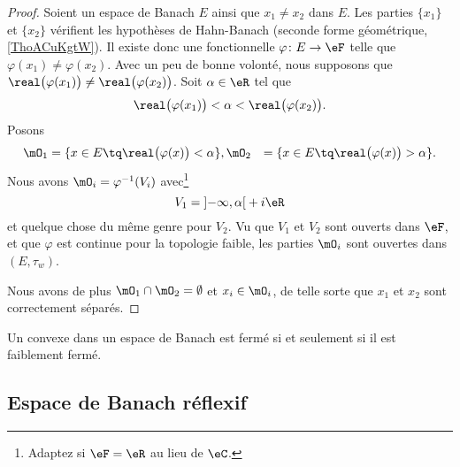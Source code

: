 \begin{proof}
    Soient un espace de Banach \( E\) ainsi que \( x_1\neq x_2\) dans \( E\). Les parties \( \{ x_1 \}\) et \( \{ x_2 \}\) vérifient les hypothèses de Hahn-Banach (seconde forme géométrique, \ref{ThoACuKgtW}). Il existe donc une fonctionnelle \( \varphi\colon E\to \eF\) telle que \( \varphi(x_1)\neq \varphi(x_2)\). Avec un peu de bonne volonté, nous supposons que \( \real\big( \varphi(x_1) \big)\neq \real\big( \varphi(x_2) \big)\). Soit \( \alpha\in \eR\) tel que
    \begin{equation}
        \real\big( \varphi(x_1) \big)<\alpha <\real\big( \varphi(x_2) \big).
    \end{equation}
    Posons
    \begin{subequations}
        \begin{align}
            \mO_1&=\{ x\in E\tq\real\big( \varphi(x) \big)< \alpha \},
            \mO_2&=\{ x\in E\tq\real\big( \varphi(x) \big)> \alpha \}.
        \end{align}
    \end{subequations}
    Nous avons \( \mO_i=\varphi^{-1}(V_i)\) avec\footnote{Adaptez si \( \eF=\eR\) au lieu de \( \eC\).}
    \begin{equation}
        V_1= \mathopen] -\infty , \alpha \mathclose[+i\eR 
    \end{equation}
    et quelque chose du même genre pour \( V_2\). Vu que \( V_1\) et \( V_2\) sont ouverts dans \( \eF\), et que \( \varphi\) est continue pour la topologie faible, les parties \( \mO_i\) sont ouvertes dans \( (E,\tau_w)\).

    Nous avons de plus \( \mO_1\cap\mO_2=\emptyset\) et \( x_i\in \mO_i\), de telle sorte que \( x_1\) et \( x_2\) sont correctement séparés.
\end{proof}

\begin{proposition}       \label{PROPooYARHooOpmztY}
    Un convexe dans un espace de Banach est fermé si et seulement si il est faiblement fermé.
\end{proposition}

\subsection{Espace de Banach réflexif}

